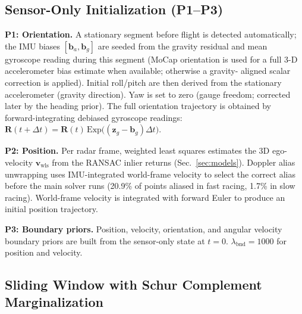\documentclass[conference]{IEEEtran}
\newcommand{\vR}{\mathbf{R}}
\newcommand{\vv}{\mathbf{v}}
\newcommand{\vb}{\mathbf{b}}
\newcommand{\vz}{\mathbf{z}}
\newcommand{\Exp}{\mathrm{Exp}}
\begin{document}
\subsection{Sensor-Only Initialization (P1--P3)}
\label{sec:init}

\textbf{P1: Orientation.}
A stationary segment before flight is detected automatically; the IMU
biases $[\vb_a, \vb_g]$ are seeded from the gravity residual and mean
gyroscope reading during this segment (MoCap orientation is used for a
full 3-D accelerometer bias estimate when available; otherwise a gravity-
aligned scalar correction is applied).
Initial roll/pitch are then derived from the stationary accelerometer
(gravity direction).  Yaw is set to zero (gauge freedom; corrected
later by the heading prior).  The full orientation trajectory is
obtained by forward-integrating debiased gyroscope readings:
$\vR(t+\Delta t) = \vR(t)\,\Exp\!\bigl((\vz_g - \vb_g)\Delta t\bigr)$.

\textbf{P2: Position.}
Per radar frame, weighted least squares estimates the 3D ego-velocity
$\vv_{\text{wls}}$ from the RANSAC inlier returns
(Sec.~\ref{sec:models}).  Doppler alias
unwrapping uses IMU-integrated world-frame velocity to select the
correct alias before the main solver runs (20.9\% of points aliased
in fast racing, 1.7\% in slow racing).
World-frame velocity is integrated with forward Euler to produce an
initial position trajectory.

\textbf{P3: Boundary priors.}
Position, velocity, orientation, and angular velocity boundary
priors are built from the sensor-only state at $t=0$.
$\lambda_{\text{bnd}} = 1000$ for position and velocity.

\subsection{Sliding Window with Schur Complement Marginalization}
\label{sec:sw}
\end{document}
